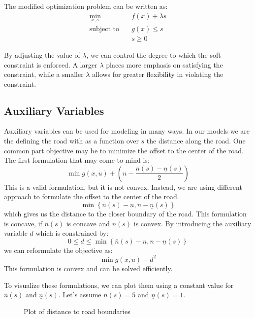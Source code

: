 The modified optimization problem can be written as:
\begin{align*}
	\min_{x, s} \quad       & f(x) + \lambda s \\
	\text{subject to} \quad & g(x) \leq s      \\
	                        & s \geq 0
\end{align*}

By adjusting the value of \( \lambda \), we can control the degree to which the soft constraint is enforced.
A larger \( \lambda \) places more emphasis on satisfying the constraint, while a smaller \( \lambda \) allows for greater flexibility in violating
the constraint.

\subsection{Auxiliary Variables}

Auxiliary variables can be used for modeling in many ways.
In our models we are the defining the road with as a function over $s$ the distance along the road.
One common part objective may be to minimize the offset to the center of the road.
The first formulation that may come to mind is: \[ \min g(x, u) + \left( n - \frac{\overline{n}(s) - \underline{n}(s)}{2} \right) \] This is a valid
formulation, but it is not convex.
Instead, we are using different approach to formulate the offset to the center of the road.
\[
	\min \left\{ \overline{n}(s) - n, n - \underline{n}(s) \right\}
\]
which gives us the distance to the closer boundary of the road.
This formulation is concave, if $\overline{n}(s)$ is concave and $\underline{n}(s)$ is convex.
By introducing the auxiliary variable $d$ which is constrained by: \[ 0 \leq d \leq \min \left\{ \overline{n}(s) - n, n - \underline{n}(s) \right\}
\] we can reformulate the objective as: \[ \min g(x, u) - d^2 \] This formulation is convex and can be solved efficiently.

To visualize these formulations, we can plot them using a constant value for \(\overline{n}(s)\) and \(\underline{n}(s)\).
Let's assume \(\overline{n}(s) = 5\) and \(\underline{n}(s) = 1\).

\begin{figure}[H]
	\centering
	\caption{Plot of distance to road boundaries}
	\label{fig:road_boundaries}
\end{figure}

